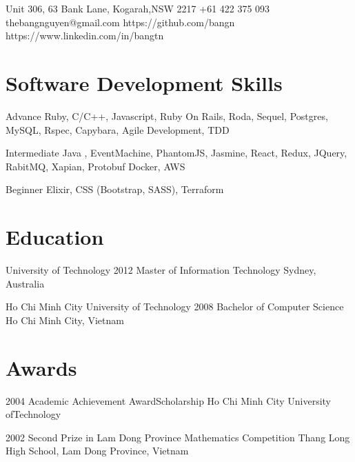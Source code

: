 \documentclass{tccv}
\begin{document}
\personal
    {Unit 306, 63 Bank Lane, Kogarah,\newline NSW 2217}
    {+61 422 375 093}
    {thebangnguyen@gmail.com}
    {https://github.com/bangn}
    {https://www.linkedin.com/in/bangtn}

\section{Software Development Skills}

\begin{factlist}

\item{Advance}
     {Ruby, C/C++, Javascript,
     Ruby On Rails, Roda, Sequel,
     Postgres, MySQL,
     \newline Rspec, Capybara,
     \newline Agile Development, TDD}

\item{Intermediate}
     {Java , EventMachine, PhantomJS, Jasmine,
     \newline  React, Redux, JQuery,
     \newline RabitMQ, Xapian, Protobuf
     \newline Docker, AWS}

\item{Beginner}
     {Elixir, CSS (Bootstrap, SASS), Terraform}
\end{factlist}

\section{Education}

\begin{yearlist}

\item[University of Technology]{2012}
     {Master of Information Technology}
     {Sydney, Australia}

\item[Ho Chi Minh City University of Technology]{2008}
     {Bachelor of Computer Science}
     {Ho Chi Minh City, Vietnam}

\end{yearlist}

\section{Awards}

\begin{yearlist}

\item{2004}
     {Academic Achievement Award\newline Scholarship}
     {Ho Chi Minh City University of\newline Technology}

\item{2002}
     {Second Prize in Lam Dong Province Mathematics Competition}
     {Thang Long High School, Lam Dong Province, Vietnam}

\end{yearlist}
\end{document}
